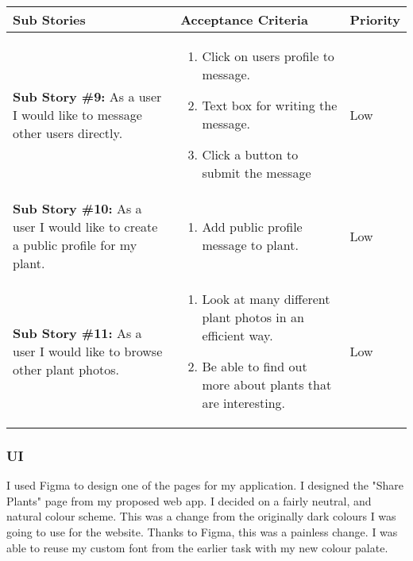 \documentclass[portfolio.tex.tex]{subfiles}
\begin{document}
					\begin{tabular}{p{6cm}|p{6cm}|p{4cm}}
						\large\textbf{Sub Stories} & \large \textbf{Acceptance Criteria} &\large \textbf{ Priority} \\
						\hline

							\textbf{Sub Story \#9:} As a user I would like to message other users directly.  &
						\vspace{-0.8cm}
						\begin{enumerate}
							\item 	Click on users profile to message.
							\item 	Text box for writing the message.
							\item 	Click a button to submit the message
						\end{enumerate}&

						\vspace{-1cm}\color{blue}Low\\

						\textbf{Sub Story \#10:} As a user I would like to create a public profile for my plant.  &
						\vspace{-0.8cm}
						\begin{enumerate}
							\item 	Add public profile message to plant.
						\end{enumerate}&

						\vspace{-1cm}\color{blue}Low\\

						\textbf{Sub Story \#11:} As a user I would like to browse other plant photos.  &
						\vspace{-0.8cm}
						\begin{enumerate}
							\item 	Look at many different plant photos in an efficient way.
							\item 	Be able to find out more about plants that are interesting.
						\end{enumerate}&

						\vspace{-1cm}\color{blue}Low\\
					\end{tabular}



				\subsubsection{UI}
					I used Figma to design one of the pages for my application. I designed the "Share Plants" page from my proposed web app. I decided on a fairly neutral, and natural colour scheme. This was a change from the originally dark colours I was going to use for the website.  Thanks to Figma, this was a painless change.
					I was able to reuse my custom font from the earlier task with my new colour palate. \\
\end{document}

